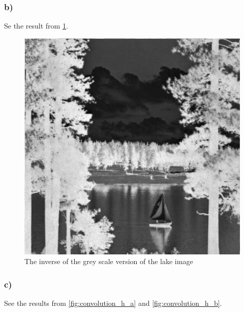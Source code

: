 \subsubsection*{b)}
Se the result from \cref{fig:inverse}. 
\begin{figure}[]
    \centering
    \includegraphics[width=1.00\textwidth]{figures/image_processed/lake_inverse.jpg}
    \caption{The inverse of the grey scale version of the lake image}
    \label{fig:inverse}
\end{figure}

\subsubsection*{c)}
See the results from \cref{fig:convolution_h_a} and \cref{fig:convolution_h_b}.

